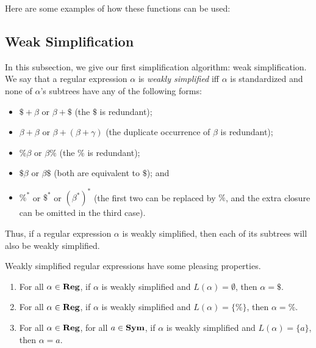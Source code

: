 Here are some examples of how these functions can be used:


\subsection{Weak Simplification}

In this subsection, we give our first simplification algorithm: weak
simplification.  We say that a regular expression $\alpha$ is
\emph{weakly simplified}
%
%
%
iff $\alpha$ is standardized and none of $\alpha$'s subtrees have
any of the following forms:
\begin{itemize}
\item $\$+\beta$ or $\beta+\$$ (the $\$$ is redundant);

\item $\beta+\beta$ or $\beta+(\beta+\gamma)$ (the duplicate occurrence
  of $\beta$ is redundant);

\item $\%\beta$ or $\beta\%$ (the $\%$ is redundant);

\item $\$\beta$ or $\beta\$$ (both are equivalent to $\$$); and

\item $\%^*$ or $\$^*$ or $(\beta^*)^*$ (the first two can be replaced
  by $\%$, and the extra closure can be omitted in the third case).
\end{itemize}
Thus, if a regular expression $\alpha$ is weakly simplified,
then each of its subtrees will also be weakly simplified.

Weakly simplified regular expressions have some pleasing properties.

\begin{proposition}
\label{WeakSimpProp3}
\begin{enumerate}[\quad(1)]
\item For all $\alpha\in\mathbf{Reg}$, if $\alpha$ is weakly simplified and
  $L(\alpha)=\emptyset$, then $\alpha=\$$.

\item For all $\alpha\in\mathbf{Reg}$, if $\alpha$ is weakly simplified and
  $L(\alpha)=\{\%\}$, then $\alpha=\%$.

\item For all $\alpha\in\mathbf{Reg}$, for all $a\in\mathbf{Sym}$, if $\alpha$ is
  weakly simplified and $L(\alpha)=\{a\}$, then $\alpha=a$.
\end{enumerate}
\end{proposition}

